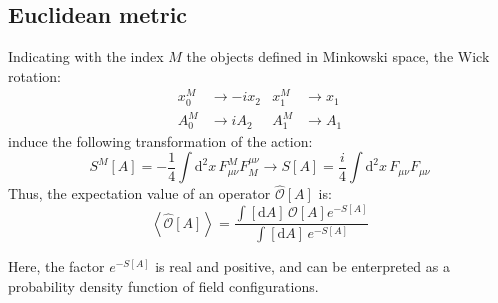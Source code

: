 \subsection*{Euclidean metric}

Indicating with the index $M$ the objects defined in Minkowski space, the Wick rotation:
\begin{align*}
    x^M_0 &\rightarrow -i x_2 & x^M_1 &\rightarrow x_1 \\
    A^M_0 &\rightarrow i A_2 & A^M_1 &\rightarrow A_1 
\end{align*}
induce the following transformation of the action:
\[
    S^M[A] = -\frac{1}{4}\int\mathrm d^2x\,F^M_{\mu\nu}F_M^{\mu\nu} \rightarrow  S[A] = \frac{i}{4}\int\mathrm d^2x\,F_{\mu\nu}F_{\mu\nu}
\]
Thus, the expectation value of an operator $\widehat{\mathcal O}[A]$ is:
\[
    \left< \widehat{\mathcal O}[A] \right> = \frac{\int[\mathrm dA]\, \mathcal O[A] e^{-S[A]}}{\int[\mathrm dA]\,e^{-S[A]}}
\]

Here, the factor $e^{-S[A]}$ is real and positive, and can be enterpreted as a probability density function of field configurations.









